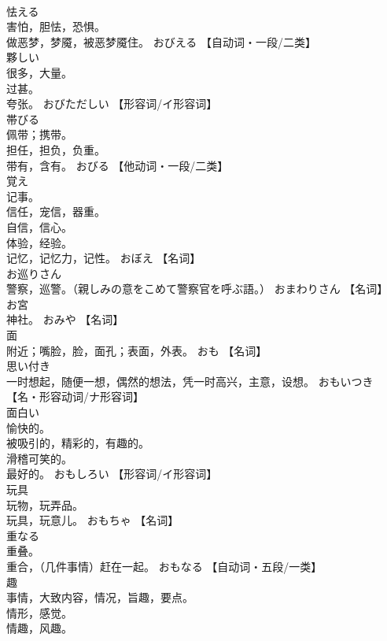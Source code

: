 \documentclass[8pt]{extreport}
\begin{document}
\begin{CJK}{UTF8}{min}
\\	怯える	
\\	害怕，胆怯，恐惧。 
\\	做恶梦，梦魇，被恶梦魇住。	おびえる		【自动词・一段/二类】
\\	夥しい	
\\	很多，大量。 
\\	过甚。 
\\	夸张。	おびただしい		【形容词/イ形容词】
\\	帯びる	
\\	佩带；携带。 
\\	担任，担负，负重。 
\\	带有，含有。	おびる		【他动词・一段/二类】
\\	覚え	
\\	记事。 
\\	信任，宠信，器重。 
\\	自信，信心。 
\\	体验，经验。 
\\	记忆，记忆力，记性。	おぼえ		【名词】
\\	お巡りさん	
\\	警察，巡警。（親しみの意をこめて警察官を呼ぶ語。）	おまわりさん		【名词】
\\	お宮	
\\	神社。	おみや		【名词】
\\	面	
\\	附近；嘴脸，脸，面孔；表面，外表。	おも		【名词】
\\	思い付き	
\\	一时想起，随便一想，偶然的想法，凭一时高兴，主意，设想。	おもいつき		【名・形容动词/ナ形容词】
\\	面白い	
\\	愉快的。 
\\	被吸引的，精彩的，有趣的。 
\\	滑稽可笑的。 
\\	最好的。	おもしろい		【形容词/イ形容词】
\\	玩具	
\\	玩物，玩弄品。 
\\	玩具，玩意儿。	おもちゃ		【名词】
\\	重なる	
\\	重叠。 
\\	重合，（几件事情）赶在一起。	おもなる		【自动词・五段/一类】
\\	趣	
\\	事情，大致内容，情况，旨趣，要点。 
\\	情形，感觉。 
\\	情趣，风趣。 

\end{CJK}
\end{document}
